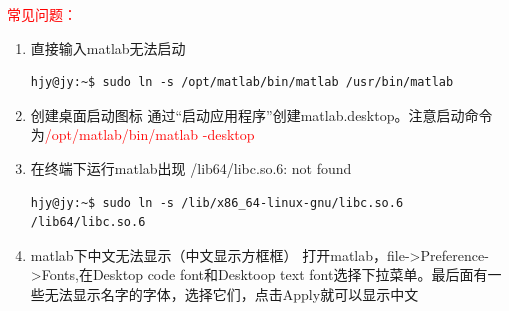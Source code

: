 \textcolor{red}{常见问题：}
\begin{enumerate}
\item 直接输入matlab无法启动
\begin{lstlisting}[style=BASH]
hjy@jy:~$ sudo ln -s /opt/matlab/bin/matlab /usr/bin/matlab
\end{lstlisting}

\item 创建桌面启动图标
通过“启动应用程序”创建matlab.desktop。注意启动命令为\textcolor{red}{/opt/matlab/bin/matlab -desktop}

\item 在终端下运行matlab出现 /lib64/libc.so.6: not found
\begin{lstlisting}[style=BASH]
hjy@jy:~$ sudo ln -s /lib/x86_64-linux-gnu/libc.so.6 /lib64/libc.so.6
\end{lstlisting}

\item matlab下中文无法显示（中文显示方框框）
打开matlab，file->Preference->Fonts,在Desktop code font和Desktoop text font选择下拉菜单。最后面有一些无法显示名字的字体，选择它们，点击Apply就可以显示中文
\end{enumerate}


